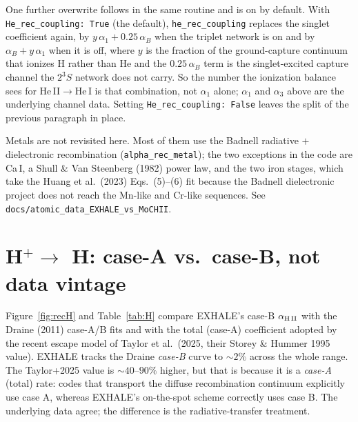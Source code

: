 \documentclass[english,a4paper]{my_memo}
\begin{document}
One further overwrite follows in the same routine and is on by default. With
\texttt{He\_rec\_coupling: True} (the default), \texttt{he\_rec\_coupling}
replaces the singlet coefficient again, by
$y\,\alpha_1 + 0.25\,\alpha_B$ when the triplet network is on and by
$\alpha_B + y\,\alpha_1$ when it is off, where $y$ is the fraction of the
ground-capture continuum that ionizes H rather than He and the $0.25\,\alpha_B$
term is the singlet-excited capture channel the $2^3S$ network does not carry.
So the number the ionization balance sees for He\,II$\to$He\,I is that
combination, not $\alpha_1$ alone; $\alpha_1$ and $\alpha_3$ above are the
underlying channel data. Setting \texttt{He\_rec\_coupling: False} leaves the
split of the previous paragraph in place.

Metals are not revisited here. Most of them use the Badnell radiative $+$
dielectronic recombination (\texttt{alpha\_rec\_metal}); the two exceptions in
the code are Ca\,I, a Shull \& Van Steenberg (1982) power law, and the two iron
stages, which take the Huang et al.\ (2023) Eqs.~(5)--(6) fit because the Badnell
dielectronic project does not reach the Mn-like and Cr-like sequences. See
\texttt{docs/atomic\_data\_EXHALE\_vs\_MoCHII}.

\section{H$^+\to$ H: case-A vs.\ case-B, not data vintage}\label{sec:H}

Figure~\ref{fig:recH} and Table~\ref{tab:H} compare EXHALE's case-B
$\alpha_{\rm H\,II}$ with the Draine (2011) case-A/B fits and with the
total (case-A) coefficient adopted by the recent escape model of Taylor
et al.\ (2025, their Storey \& Hummer 1995 value). EXHALE tracks the
Draine \emph{case-B} curve to $\sim$$2\%$ across the whole range. The
Taylor+2025 value is $\sim$$40$--$90\%$ higher, but that is because it is
a \emph{case-A} (total) rate: codes that transport the diffuse
recombination continuum explicitly use case A, whereas EXHALE's
on-the-spot scheme correctly uses case B. The underlying data agree; the
difference is the radiative-transfer treatment.
\end{document}
